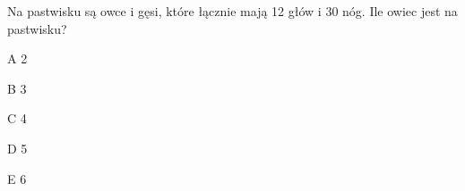 \begin{tresc}
Na pastwisku są owce i gęsi, które łącznie mają 12 głów i 30 nóg. Ile owiec jest na pastwisku?
\end{tresc}
\begin{wariant}{A} 2 \end{wariant}
\begin{wariant}{B} 3 \end{wariant}
\begin{wariant}{C} 4 \end{wariant}
\begin{wariant}{D} 5 \end{wariant}
\begin{wariant}{E} 6 \end{wariant}
